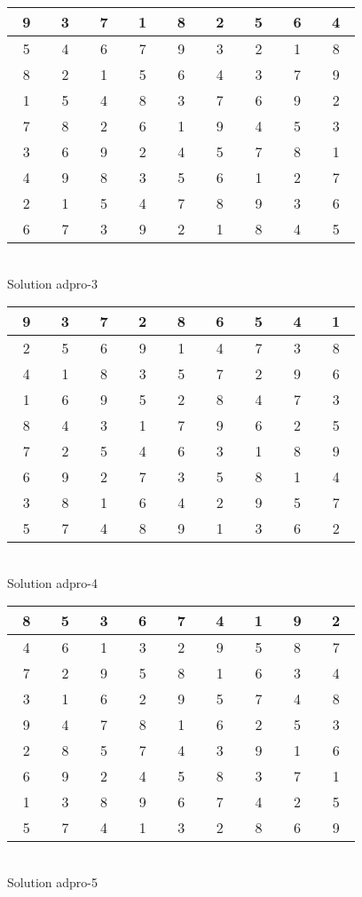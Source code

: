 \documentclass[12pt,a4paper]{article}
\begin{document}
\begin{center}
\begin{tabular}{||c|c|c||c|c|c||c|c|c||}\hline\hline
~9~&~3~&~7~&~1~&~8~&~2~&~5~&~6~&~4~\\\hline
~5~&~4~&~6~&~7~&~9~&~3~&~2~&~1~&~8~\\\hline
~8~&~2~&~1~&~5~&~6~&~4~&~3~&~7~&~9~\\\hline
\hline
~1~&~5~&~4~&~8~&~3~&~7~&~6~&~9~&~2~\\\hline
~7~&~8~&~2~&~6~&~1~&~9~&~4~&~5~&~3~\\\hline
~3~&~6~&~9~&~2~&~4~&~5~&~7~&~8~&~1~\\\hline
\hline
~4~&~9~&~8~&~3~&~5~&~6~&~1~&~2~&~7~\\\hline
~2~&~1~&~5~&~4~&~7~&~8~&~9~&~3~&~6~\\\hline
~6~&~7~&~3~&~9~&~2~&~1~&~8~&~4~&~5~\\\hline
\hline\end{tabular}\\[1.5ex]
Solution adpro-3
\end{center}
\begin{center}
\begin{tabular}{||c|c|c||c|c|c||c|c|c||}\hline\hline
~9~&~3~&~7~&~2~&~8~&~6~&~5~&~4~&~1~\\\hline
~2~&~5~&~6~&~9~&~1~&~4~&~7~&~3~&~8~\\\hline
~4~&~1~&~8~&~3~&~5~&~7~&~2~&~9~&~6~\\\hline
\hline
~1~&~6~&~9~&~5~&~2~&~8~&~4~&~7~&~3~\\\hline
~8~&~4~&~3~&~1~&~7~&~9~&~6~&~2~&~5~\\\hline
~7~&~2~&~5~&~4~&~6~&~3~&~1~&~8~&~9~\\\hline
\hline
~6~&~9~&~2~&~7~&~3~&~5~&~8~&~1~&~4~\\\hline
~3~&~8~&~1~&~6~&~4~&~2~&~9~&~5~&~7~\\\hline
~5~&~7~&~4~&~8~&~9~&~1~&~3~&~6~&~2~\\\hline
\hline\end{tabular}\\[1.5ex]
Solution adpro-4
\end{center}
\begin{center}
\begin{tabular}{||c|c|c||c|c|c||c|c|c||}\hline\hline
~8~&~5~&~3~&~6~&~7~&~4~&~1~&~9~&~2~\\\hline
~4~&~6~&~1~&~3~&~2~&~9~&~5~&~8~&~7~\\\hline
~7~&~2~&~9~&~5~&~8~&~1~&~6~&~3~&~4~\\\hline
\hline
~3~&~1~&~6~&~2~&~9~&~5~&~7~&~4~&~8~\\\hline
~9~&~4~&~7~&~8~&~1~&~6~&~2~&~5~&~3~\\\hline
~2~&~8~&~5~&~7~&~4~&~3~&~9~&~1~&~6~\\\hline
\hline
~6~&~9~&~2~&~4~&~5~&~8~&~3~&~7~&~1~\\\hline
~1~&~3~&~8~&~9~&~6~&~7~&~4~&~2~&~5~\\\hline
~5~&~7~&~4~&~1~&~3~&~2~&~8~&~6~&~9~\\\hline
\hline\end{tabular}\\[1.5ex]
Solution adpro-5
\end{center}
\end{document}
